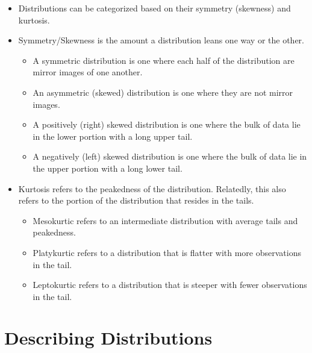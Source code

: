 \documentclass[12pt]{article}
\begin{document}
\begin{itemize}
\itemsep1pt\parskip0pt
\item
  Distributions can be categorized based on their symmetry (skewness)
  and kurtosis.
\item
  Symmetry/Skewness is the amount a distribution leans one way or the
  other.

  \begin{itemize}
  \itemsep1pt\parskip0pt
  \item
    A symmetric distribution is one where each half of the distribution
    are mirror images of one another.
  \item
    An asymmetric (skewed) distribution is one where they are not mirror
    images.
  \item
    A positively (right) skewed distribution is one where the bulk of
    data lie in the lower portion with a long upper tail.
  \item
    A negatively (left) skewed distribution is one where the bulk of
    data lie in the upper portion with a long lower tail.
  \end{itemize}
\item
  Kurtosis refers to the peakedness of the distribution. Relatedly, this
  also refers to the portion of the distribution that resides in the
  tails.

  \begin{itemize}
  \itemsep1pt\parskip0pt
  \item
    Mesokurtic refers to an intermediate distribution with average tails
    and peakedness.
  \item
    Platykurtic refers to a distribution that is flatter with more
    observations in the tail.
  \item
    Leptokurtic refers to a distribution that is steeper with fewer
    observations in the tail.
  \end{itemize}
\end{itemize}

\section{Describing Distributions}\label{describing-distributions}
\end{document}
